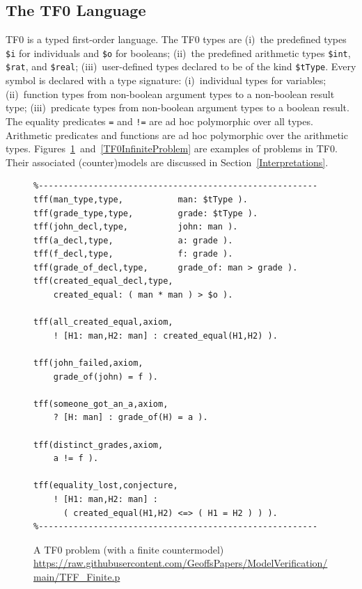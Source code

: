 \documentclass{easychair}
\newcommand{\smalltt}[1]{\small \texttt{#1}}
\begin{document}
\subsection{The TF0 Language}
\label{TF0}

TF0 is a typed first-order language.
The TF0 types are
(i)~the predefined types {\smalltt{\$i}} for individuals and {\smalltt{\$o}} for booleans; 
(ii)~the predefined arithmetic types {\smalltt{\$int}}, {\smalltt{\$rat}}, and {\smalltt{\$real}}; 
(iii)~user-defined types declared to be of the kind {\smalltt{\$tType}}.
Every symbol is declared with a type signature:
(i)~individual types for variables;
(ii)~function types from non-boolean argument types to a non-boolean result type;
(iii)~predicate types from non-boolean argument types to a boolean result.
The equality predicates {\tt =} and {\tt !=} are ad hoc polymorphic over all types. 
Arithmetic predicates and functions are ad hoc polymorphic over the arithmetic types.
Figures~\ref{TF0FiniteProblem}~and~\ref{TF0InfiniteProblem} are examples of problems in TF0.  Their associated (counter)models are discussed in Section~\ref{Interpretations}.

\begin{figure}[htbp]
\small
{}
\begin{verbatim}
%--------------------------------------------------------
tff(man_type,type,           man: $tType ).
tff(grade_type,type,         grade: $tType ).
tff(john_decl,type,          john: man ).
tff(a_decl,type,             a: grade ).
tff(f_decl,type,             f: grade ).
tff(grade_of_decl,type,      grade_of: man > grade ).
tff(created_equal_decl,type, 
    created_equal: ( man * man ) > $o ).

tff(all_created_equal,axiom,
    ! [H1: man,H2: man] : created_equal(H1,H2) ).

tff(john_failed,axiom,
    grade_of(john) = f ).

tff(someone_got_an_a,axiom,
    ? [H: man] : grade_of(H) = a ).

tff(distinct_grades,axiom,
    a != f ).

tff(equality_lost,conjecture,
    ! [H1: man,H2: man] :
      ( created_equal(H1,H2) <=> ( H1 = H2 ) ) ).
%--------------------------------------------------------
\end{verbatim}
\caption{A TF0 problem (with a finite countermodel)\\
{\footnotesize \url{https://raw.githubusercontent.com/GeoffsPapers/ModelVerification/main/TFF_Finite.p}}}
\label{TF0FiniteProblem}
\end{figure}
\end{document}
